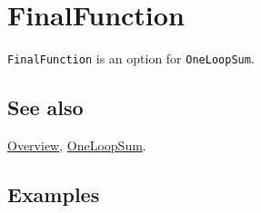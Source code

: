 \documentclass[../FeynCalcManual.tex]{subfiles}
\begin{document}
\hypertarget{finalfunction}{%
\section{FinalFunction}\label{finalfunction}}

\texttt{FinalFunction} is an option for \texttt{OneLoopSum}.

\subsection{See also}

\hyperlink{toc}{Overview}, \hyperlink{oneloopsum}{OneLoopSum}.

\subsection{Examples}
\end{document}

